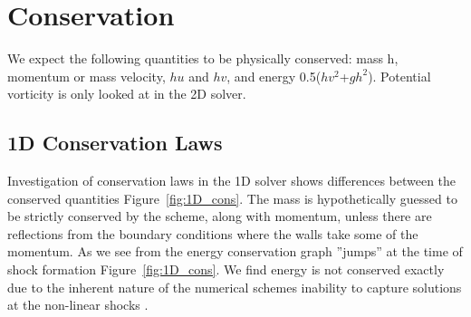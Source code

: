\section{Conservation}

We expect the following quantities to be physically conserved: mass h, momentum or mass velocity, $hu$ and $hv$, and
energy 0.5($hv^2$+$gh^2$). Potential vorticity is only looked at in the 2D solver. 

\subsection{1D Conservation Laws}
Investigation of conservation laws in the 1D solver shows differences
between the conserved quantities Figure~\ref{fig:1D_cons}. The mass is hypothetically guessed to be strictly conserved by the scheme, along with 
momentum, unless there are reflections from the boundary conditions where the walls take some of the momentum. As we see from the energy conservation 
graph ''jumps'' at the time of shock formation Figure~\ref{fig:1D_cons}. We find energy is not conserved 
exactly due to the inherent nature of the numerical schemes inability to capture solutions at the non-linear shocks \cite{Lax}. 
\newline

